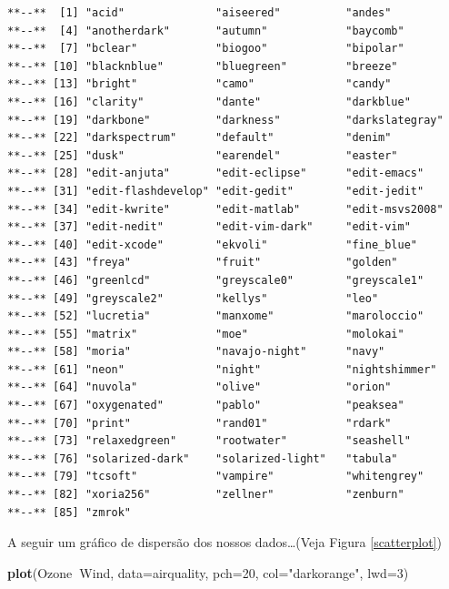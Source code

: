 \documentclass[12pt,brazil,]{article}
\newenvironment{Shaded}{\begin{snugshade}}{\end{snugshade}}
\newcommand{\DataTypeTok}[1]{\textcolor[rgb]{0.13,0.29,0.53}{#1}}
\newcommand{\DecValTok}[1]{\textcolor[rgb]{0.00,0.00,0.81}{#1}}
\newcommand{\KeywordTok}[1]{\textcolor[rgb]{0.13,0.29,0.53}{\textbf{#1}}}
\newcommand{\NormalTok}[1]{#1}
\newcommand{\OperatorTok}[1]{\textcolor[rgb]{0.81,0.36,0.00}{\textbf{#1}}}
\newcommand{\StringTok}[1]{\textcolor[rgb]{0.31,0.60,0.02}{#1}}
\begin{document}
\begin{verbatim}
**--**  [1] "acid"              "aiseered"          "andes"            
**--**  [4] "anotherdark"       "autumn"            "baycomb"          
**--**  [7] "bclear"            "biogoo"            "bipolar"          
**--** [10] "blacknblue"        "bluegreen"         "breeze"           
**--** [13] "bright"            "camo"              "candy"            
**--** [16] "clarity"           "dante"             "darkblue"         
**--** [19] "darkbone"          "darkness"          "darkslategray"    
**--** [22] "darkspectrum"      "default"           "denim"            
**--** [25] "dusk"              "earendel"          "easter"           
**--** [28] "edit-anjuta"       "edit-eclipse"      "edit-emacs"       
**--** [31] "edit-flashdevelop" "edit-gedit"        "edit-jedit"       
**--** [34] "edit-kwrite"       "edit-matlab"       "edit-msvs2008"    
**--** [37] "edit-nedit"        "edit-vim-dark"     "edit-vim"         
**--** [40] "edit-xcode"        "ekvoli"            "fine_blue"        
**--** [43] "freya"             "fruit"             "golden"           
**--** [46] "greenlcd"          "greyscale0"        "greyscale1"       
**--** [49] "greyscale2"        "kellys"            "leo"              
**--** [52] "lucretia"          "manxome"           "maroloccio"       
**--** [55] "matrix"            "moe"               "molokai"          
**--** [58] "moria"             "navajo-night"      "navy"             
**--** [61] "neon"              "night"             "nightshimmer"     
**--** [64] "nuvola"            "olive"             "orion"            
**--** [67] "oxygenated"        "pablo"             "peaksea"          
**--** [70] "print"             "rand01"            "rdark"            
**--** [73] "relaxedgreen"      "rootwater"         "seashell"         
**--** [76] "solarized-dark"    "solarized-light"   "tabula"           
**--** [79] "tcsoft"            "vampire"           "whitengrey"       
**--** [82] "xoria256"          "zellner"           "zenburn"          
**--** [85] "zmrok"
\end{verbatim}

A seguir um gráfico de dispersão dos nossos dados\ldots{}(Veja Figura
\ref{scatterplot})

\begin{Shaded}
\begin{Highlighting}[]
\KeywordTok{plot}\NormalTok{(Ozone}\OperatorTok{~}\NormalTok{Wind, }\DataTypeTok{data=}\NormalTok{airquality, }\DataTypeTok{pch=}\DecValTok{20}\NormalTok{, }
     \DataTypeTok{col=}\StringTok{"darkorange"}\NormalTok{, }\DataTypeTok{lwd=}\DecValTok{3}\NormalTok{)}
\end{Highlighting}
\end{Shaded}
\end{document}
